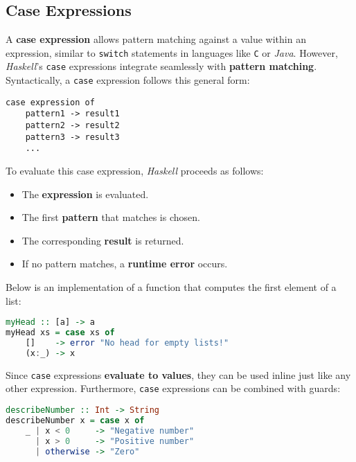 \subsection{Case Expressions}
A \textbf{case expression}  allows pattern matching against a value within an expression, similar to
\texttt{switch} statements in languages like \texttt{C} or \textsl{Java}. However, \textsl{Haskell}’s
\texttt{case} expressions integrate seamlessly with \textbf{pattern matching}. 
Syntactically, a \texttt{case} expression follows this general form:
\begin{verbatim}
case expression of
    pattern1 -> result1
    pattern2 -> result2
    pattern3 -> result3
    ...
\end{verbatim}
To evaluate this case expression, \textsl{Haskell} proceeds as follows:
\begin{itemize}
    \item The \textbf{expression} is evaluated.
    \item The first \textbf{pattern} that matches is chosen.
    \item The corresponding \textbf{result} is returned.
    \item If no pattern matches, a \textbf{runtime error} occurs.
\end{itemize}
Below is an implementation of a function that computes the first element of a list:
\begin{lstlisting}[style=haskellstyle, language=Haskell]
myHead :: [a] -> a
myHead xs = case xs of
    []    -> error "No head for empty lists!"
    (x:_) -> x
\end{lstlisting}
Since \texttt{case} expressions \textbf{evaluate to values}, they can be used inline just like any other
expression.  Furthermore, \texttt{case} expressions can be combined with guards:
\begin{lstlisting}[style=haskellstyle, language=Haskell]
describeNumber :: Int -> String
describeNumber x = case x of
    _ | x < 0     -> "Negative number"
      | x > 0     -> "Positive number"
      | otherwise -> "Zero"
\end{lstlisting}

